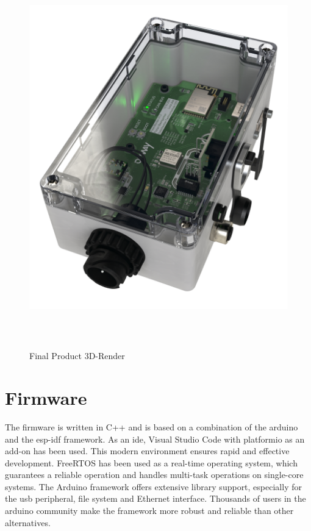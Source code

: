 \medskip
\begin{figure}[h!]
	\centering
	\includegraphics[height=16.5cm]{images/fleet-monitor-rendering}
	\caption{Final Product 3D-Render}
	\label{fig:fleet-monitor-rendering}
\end{figure}
\newpage

\section{Firmware}
The firmware is written in C++ and is based on a combination of the \gls{arduino} and the \gls{esp-idf} framework. As an \acrshort{ide}, Visual Studio Code with \gls{platformio} as an add-on has been used. This modern environment ensures rapid and effective development.\newline
FreeRTOS has been used as a real-time operating system, which guarantees a reliable operation and handles multi-task operations on single-core systems.\newline
The Arduino framework offers extensive library support, especially for the \acrshort{usb} peripheral, file system and Ethernet interface. Thousands of users in the \gls{arduino} community make the framework more robust and reliable than other alternatives.

